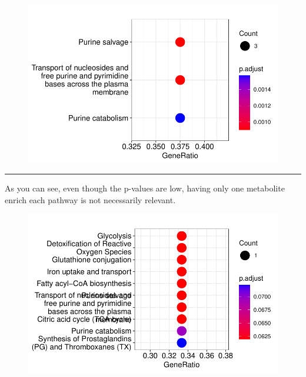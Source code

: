 \documentclass[
  24px,
  letterpaper,
  DIV=11,
  numbers=noendperiod]{scrartcl}
\newenvironment{Shaded}{\begin{snugshade}}{\end{snugshade}}
\newcommand{\AttributeTok}[1]{\textcolor[rgb]{0.40,0.45,0.13}{#1}}
\newcommand{\FloatTok}[1]{\textcolor[rgb]{0.68,0.00,0.00}{#1}}
\newcommand{\FunctionTok}[1]{\textcolor[rgb]{0.28,0.35,0.67}{#1}}
\newcommand{\NormalTok}[1]{\textcolor[rgb]{0.00,0.23,0.31}{#1}}
\newcommand{\OtherTok}[1]{\textcolor[rgb]{0.00,0.23,0.31}{#1}}
\newcommand{\SpecialCharTok}[1]{\textcolor[rgb]{0.37,0.37,0.37}{#1}}
\begin{document}
\begin{figure}[H]

{\centering \includegraphics{index_files/figure-pdf/unnamed-chunk-20-1.pdf}

}

\end{figure}

\begin{center}\rule{0.5\linewidth}{0.5pt}\end{center}

As you can see, even though the p-values are low, having only one
metabolite enrich each pathway is not necessarily relevant.

\begin{Shaded}
\end{Shaded}

\begin{figure}[H]

{\centering \includegraphics{index_files/figure-pdf/unnamed-chunk-21-1.pdf}

}

\end{figure}
\end{document}
